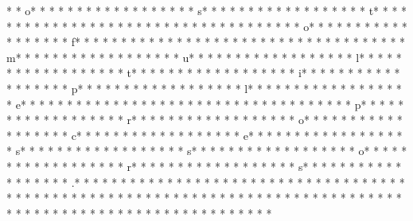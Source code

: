 *  * o* * *  * * *  * * *  *  * * *  *  * * *  * s* * *  * * *  * * *  *  * * *  *  * * *  * t* * *  * * *  * * *  *  * * *  *  * * *  *  * * *  * * *  * * *  *  * * *  *  * * *  * o* * *  * * *  * * *  *  * * *  *  * * *  * f* * *  * * *  * * *  *  * * *  *  * * *  *  * * *  * * *  * * *  *  * * *  *  * * *  * m* * *  * * *  * * *  *  * * *  *  * * *  * u* * *  * * *  * * *  *  * * *  *  * * *  * l* * *  * * *  * * *  *  * * *  *  * * *  * t* * *  * * *  * * *  *  * * *  *  * * *  * i* * *  * * *  * * *  *  * * *  *  * * *  * p* * *  * * *  * * *  *  * * *  *  * * *  * l* * *  * * *  * * *  *  * * *  *  * * *  * e* * *  * * *  * * *  *  * * *  *  * * *  *  * * *  * * *  * * *  *  * * *  *  * * *  * p* * *  * * *  * * *  *  * * *  *  * * *  * r* * *  * * *  * * *  *  * * *  *  * * *  * o* * *  * * *  * * *  *  * * *  *  * * *  * c* * *  * * *  * * *  *  * * *  *  * * *  * e* * *  * * *  * * *  *  * * *  *  * * *  * s* * *  * * *  * * *  *  * * *  *  * * *  * s* * *  * * *  * * *  *  * * *  *  * * *  * o* * *  * * *  * * *  *  * * *  *  * * *  * r* * *  * * *  * * *  *  * * *  *  * * *  * s* * *  * * *  * * *  *  * * *  *  * * *  * .* * *  * * *  * * *  *  * * *  *  * * *  *  * * *  * * *  * * *  *  * * *  *  * * *  * 
* * *  * * *  * * *  *  * * *  *  * * *  * 	* * *  * * *  * * *  *  * * *  *  * * *  * 	* * *  * * *  * * *  *  * * *  *  * * *  * 	* * *  * * *  * * *  *  * * *  *  * * *  * 
